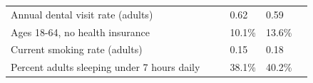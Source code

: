 \documentclass[9pt]{report}
\begin{document}
\begin{tabular}{p{.10in}p{.10in}p{.10in}p{3.7in}>{\hfill}p{.85in}>{\hfill}p{.85in}>{\hfill}p{.85in}>{\hfill}p{.85in}p{0.1in}}
\multicolumn{4}{l}{\parbox{3.6in}{\strut\raggedright{{Annual dental visit rate (adults)}}\strut}} &  &  & 0.62 & 0.59 & \multicolumn{1}{l}{}  \\ 
\multicolumn{4}{l}{\parbox{3.6in}{\strut\raggedright{{Ages 18-64, no health insurance}}\strut}} &  &  & 10.1\% & 13.6\% & \multicolumn{1}{l}{}  \\ 
\multicolumn{4}{l}{\parbox{3.6in}{\strut\raggedright{{Current smoking rate (adults)}}\strut}} &  &  & 0.15 & 0.18 & \multicolumn{1}{l}{}  \\ 
\multicolumn{4}{l}{\parbox{3.6in}{\strut\raggedright{{Percent adults sleeping under 7 hours daily}}\strut}} &  &  & 38.1\% & 40.2\% & \multicolumn{1}{l}{}  \\ 

\end{tabular}
\setlength{\tabcolsep}{6pt} %


\vspace{36pt}
\linespread{1.5}
\theendnotes
\end{document}
